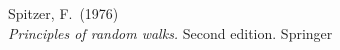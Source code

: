 \begin{thebibliography}{xxxxxx 89}
 Spitzer, F.~(1976)\\ {\em Principles of random walks.} Second edition. Springer




\end{thebibliography}
